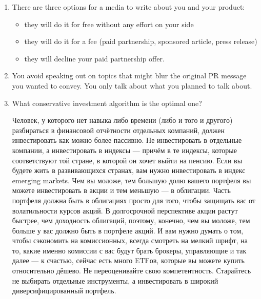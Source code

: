 \documentclass[11pt]{article}
\theoremstyle{remark}
\theoremstyle{definition}
\begin{document}
\begin{enumerate}
\item There are three options for a media to write about you and your product:
\begin{itemize}
\item they will do it for free without any effort on your side
\item they will do it for a fee (paid partnership, sponsored article, press release)
\item they will decline your paid partnership offer.
\end{itemize}



\item You avoid speaking out on topics that might blur the original PR message you wanted to convey. You only talk about what you planned to talk about.





\item What conservative investment algorithm is the optimal one?








Человек, у которого нет навыка либо времени (либо и того и другого) разбираться в финансовой отчётности отдельных компаний, должен инвестировать как можно более пассивно. Не инвестировать в отдельные компании, а инвестировать в индексы --- причём в те индексы, которые соответствуют той стране, в которой он хочет выйти на пенсию. Если вы будете жить в развивающихся странах, вам нужно инвестировать в индекс emerging markets. Чем вы моложе, тем большую долю вашего портфеля вы можете инвестировать в акции и тем меньшую --- в облигации. Часть портфеля должна быть в облигациях просто для того, чтобы защищать вас от волатильности курсов акций. В долгосрочной перспективе акции растут быстрее, чем доходность облигаций, поэтому, конечно, чем вы моложе, тем больше у вас должно быть в портфеле акций. И вам нужно думать о том, чтобы сэкономить на комиссионных, всегда смотреть на мелкий шрифт, на то, какие именно комиссии с вас будут брать брокеры, управляющие и так далее --- к счастью, сейчас есть много ETFов, которые вы можете купить относительно дёшево. Не переоценивайте свою компетентность. Старайтесь не выбирать отдельные инструменты, а инвестировать в широкий диверсифицированный портфель. 


\end{enumerate}
\end{document}
